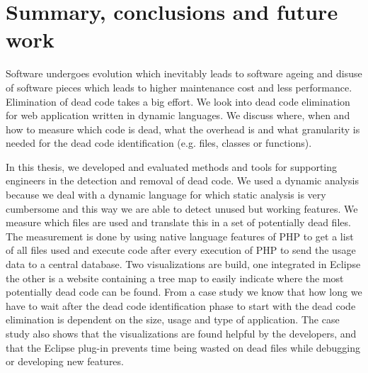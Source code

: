 \chapter{Summary, conclusions and future work\label{ch:conclusions}\label{ch:future}}


Software undergoes evolution which inevitably leads to software ageing and disuse of software pieces which leads to higher maintenance cost and less performance\cite{chen1998,godfrey2000,huang2003,kiewkanya2005,scanniello2011}. Elimination of dead code takes a big effort\cite{andreopoulos2004,jones2006,scanniello2011}. We look into dead code elimination for web application written in dynamic languages. We discuss where, when and how to measure which code is dead, what the overhead is and what granularity is needed for the dead code identification (e.g. files, classes or functions).

In this thesis, we developed and evaluated methods and tools for supporting engineers in the detection and removal of dead code. We used a dynamic analysis because we deal with a dynamic language for which static analysis is very cumbersome\cite{biggar2009,biggar2009draft,biggar2010,devries2007,tratt2009} and this way we are able to detect unused but working features. We measure which files are used and translate this in a set of potentially dead files. The measurement is done by using native language features of PHP to get a list of all files used and execute code after every execution of PHP to send the usage data to a central database. Two visualizations are build, one integrated in Eclipse the other is a website containing a tree map to easily indicate where the most potentially dead code can be found. From a case study we know that how long we have to wait after the dead code identification phase to start with the dead code elimination is dependent on the size, usage and type of application. The case study also shows that the visualizations are found helpful by the developers, and that the Eclipse plug-in prevents time being wasted on dead files while debugging or developing new features.

